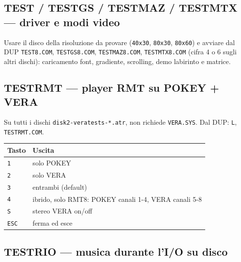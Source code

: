 \documentclass[
]{article}
\newenvironment{Shaded}{}{}
\newcommand{\AttributeTok}[1]{\textcolor[rgb]{0.49,0.56,0.16}{#1}}
\newcommand{\DataTypeTok}[1]{\textcolor[rgb]{0.56,0.13,0.00}{#1}}
\newcommand{\NormalTok}[1]{#1}
\newcommand{\VariableTok}[1]{\textcolor[rgb]{0.10,0.09,0.49}{#1}}
\begin{document}
\subsection{TEST / TESTGS / TESTMAZ / TESTMTX --- driver e modi
video}\label{test-testgs-testmaz-testmtx-driver-e-modi-video}

\begin{Shaded}
\end{Shaded}

Usare il disco della risoluzione da provare (\texttt{40x30},
\texttt{80x30}, \texttt{80x60}) e avviare dal DUP \texttt{TEST8.COM},
\texttt{TESTGS8.COM}, \texttt{TESTMAZ8.COM}, \texttt{TESTMTX8.COM}
(cifra 4 o 6 sugli altri dischi): caricamento font, gradiente,
scrolling, demo labirinto e matrice.

\subsection{TESTRMT --- player RMT su POKEY +
VERA}\label{testrmt-player-rmt-su-pokey-vera}

Su tutti i dischi \texttt{disk2-veratests-*.atr}, non richiede
\texttt{VERA.SYS}. Dal DUP: \texttt{L}, \texttt{TESTRMT.COM}.

\begin{longtable}[]{@{}ll@{}}
\toprule\noalign{}
Tasto & Uscita \\
\midrule\noalign{}
\endhead
\bottomrule\noalign{}
\endlastfoot
\texttt{1} & solo POKEY \\
\texttt{2} & solo VERA \\
\texttt{3} & entrambi (default) \\
\texttt{4} & ibrido, solo RMT8: POKEY canali 1-4, VERA canali 5-8 \\
\texttt{S} & stereo VERA on/off \\
\texttt{ESC} & ferma ed esce \\
\end{longtable}

\subsection{TESTRIO --- musica durante l'I/O su
disco}\label{testrio-musica-durante-lio-su-disco}
\end{document}
